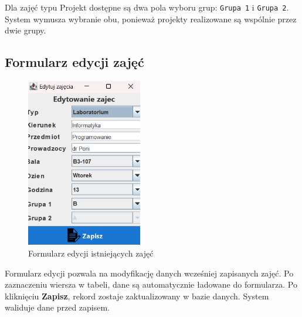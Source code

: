 Dla zajęć typu Projekt dostępne są dwa pola wyboru grup: \texttt{Grupa 1} i \texttt{Grupa 2}. System wymusza wybranie obu, ponieważ projekty realizowane są wspólnie przez dwie grupy.

\subsection*{Formularz edycji zajęć}
\begin{figure}[H]
\centering
\includegraphics[width=0.45\textwidth]{figures/workApl/edit_panel.png}
\caption{Formularz edycji istniejących zajęć}
\label{fig:edit_panel}
\end{figure}

Formularz edycji pozwala na modyfikację danych wcześniej zapisanych zajęć. Po zaznaczeniu wiersza w tabeli, dane są automatycznie ładowane do formularza. Po kliknięciu \textbf{Zapisz}, rekord zostaje zaktualizowany w bazie danych. System waliduje dane przed zapisem.